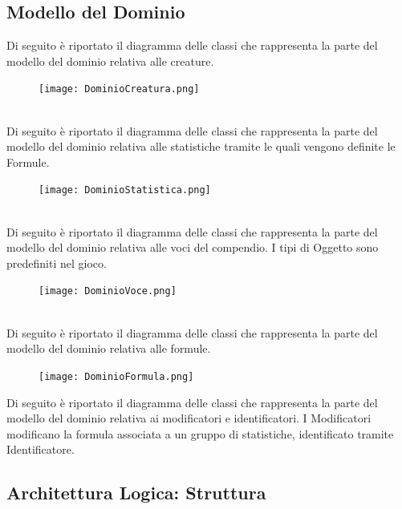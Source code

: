 \documentclass[a4paper, 11pt]{article}
\let\newline\\
\begin{document}
\clearpage
\newpage
\subsection{Modello del Dominio}
Di seguito è riportato il diagramma delle classi che rappresenta la parte del modello del dominio relativa alle creature.
\begin{figure}[h!]
    \centering
    \texttt{[image: DominioCreatura.png]}
    \label{fig:dominioCreatura}
\end{figure}
\newline

\clearpage
\newpage
Di seguito è riportato il diagramma delle classi che rappresenta la parte del modello del dominio relativa alle statistiche tramite le quali vengono definite le Formule. 
\begin{figure}[h!]
    \centering
    \texttt{[image: DominioStatistica.png]}
    \label{fig:dominioStat}
\end{figure}
\newline

\clearpage
\newpage
Di seguito è riportato il diagramma delle classi che rappresenta la parte del modello del dominio relativa alle voci del compendio. I tipi di Oggetto sono predefiniti nel gioco.
\begin{figure}[h!]
    \centering
    \texttt{[image: DominioVoce.png]}
    \label{fig:dominioVoce}
\end{figure}
\newline 
Di seguito è riportato il diagramma delle classi che rappresenta la parte del modello del dominio relativa alle formule.
\begin{figure}[h!]
    \centering
    \texttt{[image: DominioFormula.png]}
    \label{fig:dominioFormula}
\end{figure}
\clearpage
\newpage
Di seguito è riportato il diagramma delle classi che rappresenta la parte del modello del dominio relativa ai modificatori e identificatori. I Modificatori modificano la formula associata a un gruppo di statistiche, identificato tramite Identificatore.
\begin{figure}[h!]
\end{figure}

\clearpage
\newpage
\subsection{Architettura Logica: Struttura}
\end{document}

